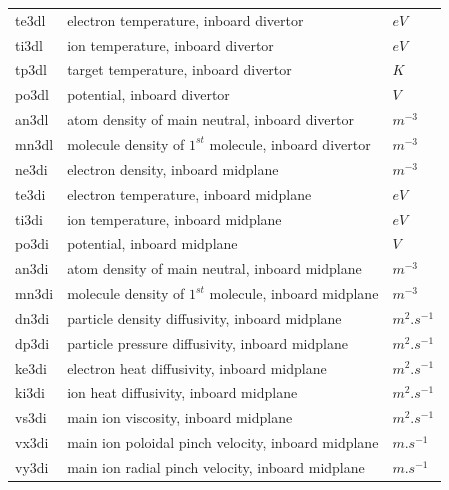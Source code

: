 \documentclass[a4paper,10pt]{report}
\begin{document}
\begin{center}
\begin{longtable}{|l|l|l|}
te3dl \index{te3dl}\index{b2time.nc, te3dl} & electron temperature, inboard divertor & $eV$ \\
ti3dl \index{ti3dl}\index{b2time.nc, ti3dl} & ion temperature, inboard divertor & $eV$ \\
tp3dl \index{tp3dl}\index{b2time.nc, tp3dl} & target temperature, inboard divertor & $K $ \\
po3dl \index{po3dl}\index{b2time.nc, po3dl} & potential, inboard divertor & $V $ \\
an3dl \index{an3dl}\index{b2time.nc, an3dl} & atom density of main neutral, inboard divertor & $m^{-3}$ \\
mn3dl \index{mn3dl}\index{b2time.nc, mn3dl} & molecule density of $1^{st}$ molecule, inboard divertor & $m^{-3}$ \\
ne3di \index{ne3di}\index{b2time.nc, ne3di} & electron density, inboard midplane & $m^{-3}$ \\
te3di \index{te3di}\index{b2time.nc, te3di} & electron temperature, inboard midplane & $eV$ \\
ti3di \index{ti3di}\index{b2time.nc, ti3di} & ion temperature, inboard midplane & $eV$ \\
po3di \index{po3di}\index{b2time.nc, po3di} & potential, inboard midplane & $V $ \\
an3di \index{an3di}\index{b2time.nc, an3di} & atom density of main neutral, inboard midplane & $m^{-3}$ \\
mn3di \index{mn3di}\index{b2time.nc, mn3di} & molecule density of $1^{st}$ molecule, inboard midplane & $m^{-3}$ \\
dn3di \index{dn3di}\index{b2time.nc, dn3di} & particle density diffusivity, inboard midplane & $m^2.s^{-1}$ \\
dp3di \index{dp3di}\index{b2time.nc, dp3di} & particle pressure diffusivity, inboard midplane & $m^2.s^{-1}$ \\
ke3di \index{ke3di}\index{b2time.nc, ke3di} & electron heat diffusivity, inboard midplane & $m^2.s^{-1}$ \\
ki3di \index{ki3di}\index{b2time.nc, ki3di} & ion heat diffusivity, inboard midplane & $m^2.s^{-1}$ \\
vs3di \index{vs3di}\index{b2time.nc, vs3di} & main ion viscosity, inboard midplane & $m^2.s^{-1}$ \\
vx3di \index{vx3di}\index{b2time.nc, vx3di} & main ion poloidal pinch velocity, inboard midplane & $m.s^{-1}$ \\
vy3di \index{vy3di}\index{b2time.nc, vy3di} & main ion radial pinch velocity, inboard midplane & $m.s^{-1}$ \\

\end{longtable}
\end{center}
\end{document}
